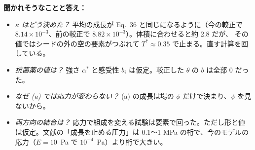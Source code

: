 \documentclass[11pt,a4paper]{article}
\begin{document}
\vspace{4pt}
\noindent\textbf{聞かれそうなことと答え：}
\begin{itemize}
\item \emph{$\kappa$ はどう決めた？} 平均の成長が Eq.~36 と同じになるように（今の較正で $8.14\times10^{-3}$、前の較正で $8.82\times10^{-3}$）。体積に合わせると約 2.8 だが、
  その値ではシードの外の空の要素がつぶれて $T^*\approx0.35$ で止まる。直す計算を回している。
\item \emph{抗菌薬の値は？} 強さ $\alpha^*$ と感受性 $b_i$ は仮定。較正した $\theta$ の $b$ は全部 0 だった。
\item \emph{なぜ (a) では応力が変わらない？} (a) の成長は場の $\phi$ だけで決まり、$\psi$ を見ないから。
\item \emph{両方向の結合は？} 応力で組成を変える試験は要素で回った。ただし形と値は仮定。文献の「成長を止める圧力」は
  0.1〜1 MPa の桁で、今のモデルの応力（$E=10$~Pa で $10^{-4}$~Pa）より桁で大きい。
\end{itemize}
\end{document}
